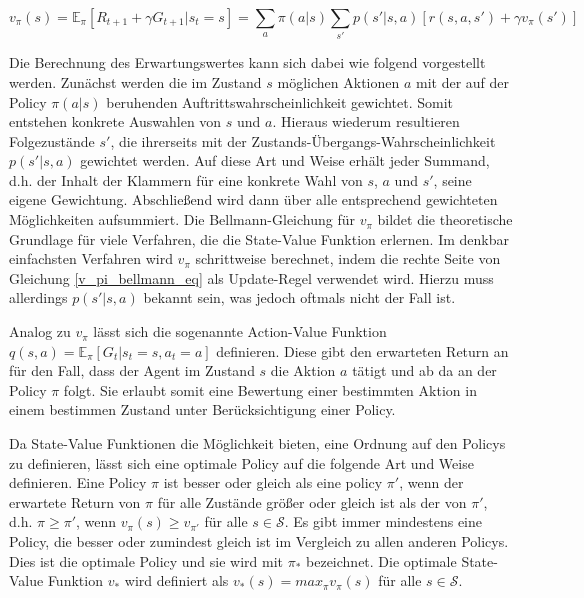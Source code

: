 \begin{equation}
  v_\pi(s) = \mathbb{E}_\pi[R_{t+1} + \gamma G_{t+1} | s_t=s] = \sum_{a} \pi(a|s) \sum_{s'} p(s'|s,a) [r(s,a,s') + \gamma v_\pi(s')]
  \label{v_pi_bellmann_eq}
\end{equation}

Die Berechnung des Erwartungswertes kann sich dabei wie folgend vorgestellt werden. Zunächst werden die im Zustand $s$ möglichen Aktionen $a$ mit der auf der Policy $\pi(a|s)$ beruhenden Auftrittswahrscheinlichkeit gewichtet. Somit entstehen konkrete Auswahlen von $s$ und $a$. Hieraus wiederum resultieren Folgezustände $s'$, die ihrerseits mit der Zustands-Übergangs-Wahrscheinlichkeit $p(s'|s,a)$ gewichtet werden. Auf diese Art und Weise erhält jeder Summand, d.h. der Inhalt der Klammern für eine konkrete Wahl von $s$, $a$ und $s'$, seine eigene Gewichtung. Abschließend wird dann über alle entsprechend gewichteten Möglichkeiten aufsummiert. Die Bellmann-Gleichung für $v_\pi$ bildet die theoretische Grundlage für viele Verfahren, die die State-Value Funktion erlernen. Im denkbar einfachsten Verfahren wird $v_\pi$ schrittweise berechnet, indem die rechte Seite von Gleichung \eqref{v_pi_bellmann_eq} als Update-Regel verwendet wird. Hierzu muss allerdings $p(s'|s,a)$ bekannt sein, was jedoch oftmals nicht der Fall ist.

Analog zu $v_\pi$ lässt sich die sogenannte Action-Value Funktion $q(s,a) = \mathbb{E}_\pi[G_t | s_t=s, a_t=a]$ definieren. Diese gibt den erwarteten Return an für den Fall, dass der Agent im Zustand $s$ die Aktion $a$ tätigt und ab da an der Policy $\pi$ folgt. Sie erlaubt somit eine Bewertung einer bestimmten Aktion in einem bestimmen Zustand unter Berücksichtigung einer Policy.

Da State-Value Funktionen die Möglichkeit bieten, eine Ordnung auf den Policys zu definieren, lässt sich eine optimale Policy auf die folgende Art und Weise definieren. Eine Policy $\pi$ ist besser oder gleich als eine policy $\pi'$, wenn der erwartete Return von $\pi$ für alle Zustände größer oder gleich ist als der von $\pi'$, d.h. $\pi \ge \pi'$, wenn $v_\pi(s) \ge v_{\pi'}$ für alle $s \in \mathcal{S}$. Es gibt immer mindestens eine Policy, die besser oder zumindest gleich ist im Vergleich zu allen anderen Policys. Dies ist die optimale Policy und sie wird mit $\pi_*$ bezeichnet. Die optimale State-Value Funktion $v_*$ wird definiert als $v_*(s) = max_\pi v_\pi(s)$ für alle $s \in \mathcal{S}$.

